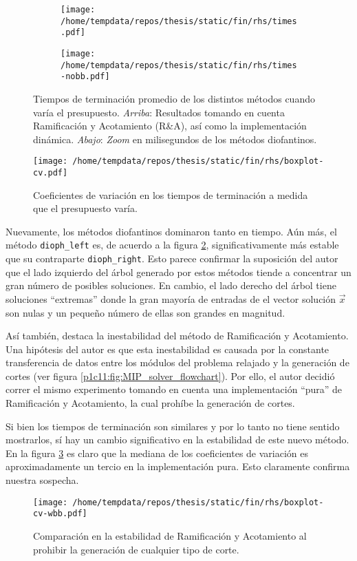 \begin{figure}[hbtp]
  \centering
  \begin{subfigure}{0.80\textwidth}
    \centering
    \texttt{[image: /home/tempdata/repos/thesis/static/fin/rhs/times.pdf]}
  \end{subfigure}
  \hfill
  \begin{subfigure}{0.80\textwidth}
    \centering
    \texttt{[image: /home/tempdata/repos/thesis/static/fin/rhs/times-nobb.pdf]}
  \end{subfigure}

  \caption{Tiempos de terminación promedio de los distintos métodos cuando varía el presupuesto.
  \textit{Arriba}: Resultados tomando en cuenta Ramificación y Acotamiento (R\&A), así como la
	implementación dinámica. \textit{Abajo}: \textit{Zoom} en milisegundos de los métodos
diofantinos.}
  \label{fig:exp:fin:rhs}
\end{figure}

\begin{figure}[hbtp]
	\centering
	\texttt{[image: /home/tempdata/repos/thesis/static/fin/rhs/boxplot-cv.pdf]}
	\caption{Coeficientes de variación en los tiempos de terminación a medida que el presupuesto
	varía.}
	\label{fig:exp:fin:rhs:cv}
\end{figure}

Nuevamente, los métodos diofantinos dominaron tanto en tiempo. Aún más, el método
\texttt{dioph\_left} es, de acuerdo a la figura \ref{fig:exp:fin:rhs:cv}, significativamente más
estable que su contraparte \texttt{dioph\_right}. Esto parece confirmar la suposición del autor que
el lado izquierdo del árbol generado por estos métodos tiende a concentrar un gran número de
posibles soluciones. En cambio, el lado derecho del árbol tiene soluciones ``extremas'' donde la
gran mayoría de entradas de el vector solución $\vec{x}$ son nulas y un pequeño número de ellas son
grandes en magnitud.

Así también, destaca la inestabilidad del método de Ramificación y Acotamiento. Una hipótesis del
autor es que esta inestabilidad es causada por la constante transferencia de datos entre los módulos
del problema relajado y la generación de cortes (ver figura \ref{p1c11:fig:MIP_solver_flowchart}).
Por ello, el autor decidió correr el mismo experimento tomando en cuenta una implementación ``pura''
de Ramificación y Acotamiento, la cual prohíbe la generación de cortes.

Si bien los tiempos de terminación son similares y por lo tanto no tiene sentido mostrarlos, sí hay
un cambio significativo en la estabilidad de este nuevo método. En la figura
\ref{fig:exp:fin:rhs:cv-wbb} es claro que la mediana de los coeficientes de variación es
aproximadamente un tercio en la implementación pura. Esto claramente confirma nuestra sospecha.

\begin{figure}[hbtp]
	\centering
	\texttt{[image: /home/tempdata/repos/thesis/static/fin/rhs/boxplot-cv-wbb.pdf]}
	\caption{Comparación en la estabilidad de Ramificación y Acotamiento al prohibir la generación
		de cualquier tipo de corte.}
	\label{fig:exp:fin:rhs:cv-wbb}
\end{figure}
